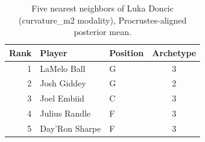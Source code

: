 \begin{table}[htbp]
  \centering\small
  \begin{tabular}{rllc}
    \toprule
    Rank & Player & Position & Archetype \\
    \midrule
    1 & LaMelo Ball & G & 3 \\
    2 & Josh Giddey & G & 2 \\
    3 & Joel Embiid & C & 3 \\
    4 & Julius Randle & F & 3 \\
    5 & Day'Ron Sharpe & F & 3 \\
    \bottomrule
  \end{tabular}
  \caption{Five nearest neighbors of Luka Doncic (curvature_m2 modality), Procrustes-aligned posterior mean.}
  \label{tab:Luka_Doncic_neighbors_curvature_m2}
\end{table}

